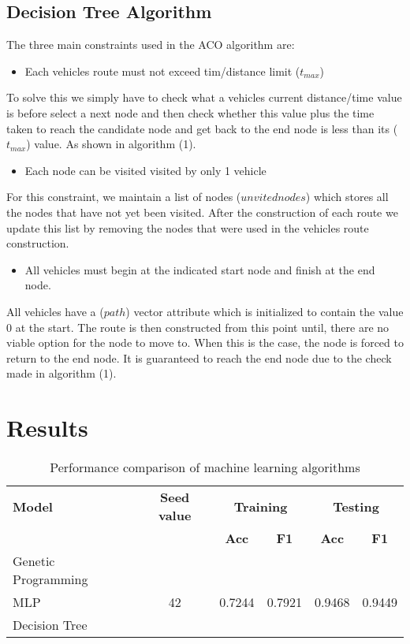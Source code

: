 \documentclass[a4paper,12pt]{article}
\begin{document}
\subsection{Decision Tree Algorithm}
The three main constraints used in the ACO algorithm are:
\begin{itemize}
\item Each vehicles route must not exceed tim/distance limit ($t_{max}$)
\end{itemize}
To solve this we simply have to check what a vehicles current distance/time value is before select a next node and then check whether this value plus the time taken to reach the candidate node and get back to the end node is less than its ($t_{max}$) value. As shown in algorithm (1).

\begin{itemize}
\item Each node can be visited visited by only 1 vehicle
\end{itemize}
For this constraint, we maintain a list of nodes ($unvitednodes$) which stores all the nodes that have not yet been visited. After the construction of each route we update this list by removing the nodes that were used in the vehicles route construction.

\begin{itemize}
\item All vehicles must begin at the indicated start node and finish at the end node.
\end{itemize}
All vehicles have a ($path$) vector attribute which is initialized to contain the value 0 at the start. The route is then constructed from this point until, there are no viable option for the node to move to. When this is the case, the node is forced to return to the end node. It is guaranteed to reach the end node due to the check made in algorithm (1).

\section{Results}

\begin{table}[h]
\centering
\begin{tabular}{|l|c|c|c|c|c|}
\hline
{\textbf{Model}} & {\textbf{Seed value}} & \multicolumn{2}{c|}{\textbf{Training}} & \multicolumn{2}{c|}{\textbf{Testing}} \\
\cline{3-6}
& & \textbf{Acc} & \textbf{F1} & \textbf{Acc} & \textbf{F1} \\
\hline
Genetic Programming & & & & & \\
\hline
MLP & 42 & 0.7244 & 0.7921 & 0.9468 & 0.9449\\
\hline
Decision Tree & & & & & \\
\hline
\end{tabular}
\caption{Performance comparison of machine learning algorithms}
\label{tab:results}
\end{table}
\end{document}

